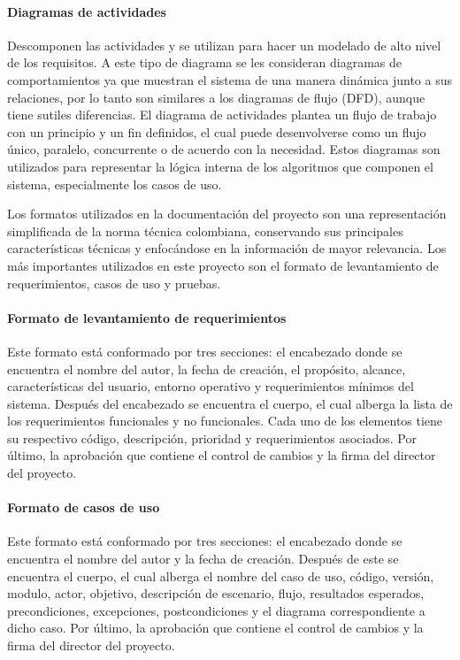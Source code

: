 \paragraph{Diagramas de actividades} Descomponen las actividades y se utilizan para hacer un modelado de alto nivel de los requisitos. A este tipo de diagrama se les consideran diagramas de comportamientos ya que muestran el sistema de una manera dinámica junto a sus relaciones, por lo tanto son similares a los diagramas de flujo (DFD), aunque tiene sutiles diferencias. El diagrama de actividades plantea un flujo de trabajo con un principio y un fin definidos, el cual puede desenvolverse como un flujo único, paralelo, concurrente o de acuerdo con la necesidad. Estos diagramas son utilizados para representar la lógica interna de los algoritmos que componen el sistema, especialmente los casos de uso.

Los formatos utilizados en la documentación del proyecto son una representación simplificada de la norma técnica colombiana, conservando sus principales características técnicas y enfocándose en la información de mayor relevancia. Los más importantes utilizados en este proyecto son el formato de levantamiento de requerimientos, casos de uso y pruebas.

\paragraph{Formato de levantamiento de requerimientos} Este formato está conformado por tres secciones: el encabezado donde se encuentra el nombre del autor, la fecha de creación, el propósito, alcance, características del usuario, entorno operativo y requerimientos mínimos del sistema. Después del encabezado se encuentra el cuerpo, el cual alberga la lista de los requerimientos funcionales y no funcionales. Cada uno de los elementos tiene su respectivo código, descripción, prioridad y requerimientos asociados. Por último, la aprobación que contiene el control de cambios y la firma del director del proyecto.

\paragraph{Formato de casos de uso} Este formato está conformado por tres secciones: el encabezado donde se encuentra el nombre del autor y la fecha de creación. Después de este se encuentra el cuerpo, el cual alberga el nombre del caso de uso, código, versión, modulo, actor, objetivo, descripción de escenario, flujo, resultados esperados, precondiciones, excepciones, postcondiciones y el diagrama correspondiente a dicho caso. Por último, la aprobación que contiene el control de cambios y la firma del director del proyecto.


